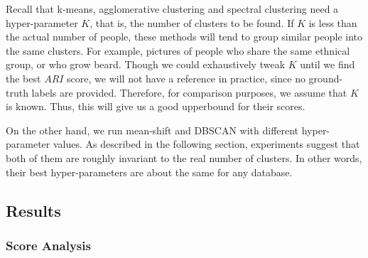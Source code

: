 \documentclass[conference]{IEEEtran}
\begin{document}
Recall that k-means, agglomerative clustering and spectral clustering need a hyper-parameter $K$, that is, the number of clusters to be found.
If $K$ is less than the actual number of people, these methods will tend to group similar people into the same clusters.
For example, pictures of people who share the same ethnical group, or who grow beard.
Though we could exhaustively tweak $K$ until we find the best $ARI$ score, we will not have a reference in practice, since no ground-truth labels are provided.
Therefore, for comparison purposes, we assume that $K$ is known.
Thus, this will give us a good upperbound for their scores.

On the other hand, we run mean-shift and DBSCAN with different hyper-parameter values.
As described in the following section, experiments suggest that both of them are roughly invariant to the real number of clusters.
In other words, their best hyper-parameters are about the same for any database.

\subsection{Results}

\subsubsection{Score Analysis}
\end{document}
